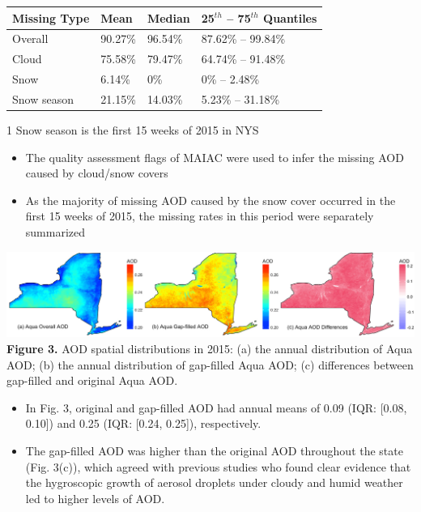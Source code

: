 \documentclass[a0paper,portrait]{baposter}
\newcommand{\compresslist}{%
 \setlength{\itemsep}{0pt}%
 \setlength{\parskip}{0pt}%
 \setlength{\parsep}{0pt}%
 }
\begin{document}
\begin{poster}
{\begin{minipage}{0.6\textwidth}
\begin{threeparttable}
\begin{tabular}{p{}<{\centering}p{}<{\centering}p{}<{\centering}p{}<{\centering}}
    \toprule
    \footnotesize\textbf{Missing Type} & \footnotesize\textbf{Mean} & \footnotesize\textbf{Median} & \footnotesize\textbf{25$^{th}$ -- 75$^{th}$ Quantiles} \\
    \midrule
    Overall & 90.27\% & 96.54\% & 87.62\% -- 99.84\% \\
    Cloud & 75.58\% & 79.47\% & 64.74\% -- 91.48\% \\
    Snow & 6.14\% & 0\% & 0\% -- 2.48\% \\
    Snow season\tnote{1} & 21.15\% & 14.03\% & 5.23\% -- 31.18\% \\
    \bottomrule
\end{tabular}
\begin{tablenotes}
\footnotesize
\item [1] Snow season is the first 15 weeks of 2015 in NYS
\end{tablenotes}
\end{threeparttable}
\end{minipage}
\begin{minipage}{0.38\textwidth}
\begin{itemize}
\compresslist
    \item The quality assessment flags of MAIAC were used to infer the missing AOD caused by cloud/snow covers
    \item As the majority of missing AOD caused by the snow cover occurred in the first 15 weeks of 2015, the missing rates in this period were separately summarized
\end{itemize}
\end{minipage}
        
\includegraphics[width=\textwidth]{aod.jpg}
\small{
\textbf{Figure 3.} AOD spatial distributions in 2015: (a) the annual distribution of Aqua AOD; (b) the annual distribution of gap-filled Aqua AOD; (c) differences between gap-filled and original Aqua AOD.
}
\begin{itemize}
\compresslist
    \item In Fig. 3, original and gap-filled AOD had annual means of 0.09 (IQR: [0.08, 0.10]) and 0.25 (IQR: [0.24, 0.25]), respectively. 
    \item The gap-filled AOD was higher than the original AOD throughout the state (Fig. 3(c)), which agreed with previous studies who found clear evidence that the hygroscopic growth of aerosol droplets under cloudy and humid weather led to higher levels of AOD.
\end{itemize}

}
\end{poster}
\end{document}
